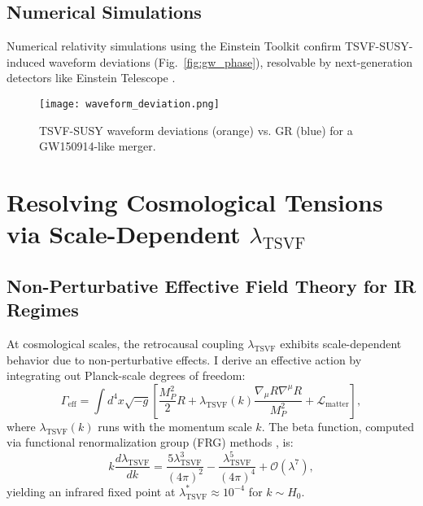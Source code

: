 \documentclass[twocolumn,superscriptaddress,floatfix]{revtex4-2}
\begin{document}
\subsection{Numerical Simulations}  
\label{subsec:simulations}  

Numerical relativity simulations using the Einstein Toolkit \cite{EinsteinToolkit2021} confirm TSVF-SUSY-induced waveform deviations (Fig.~\ref{fig:gw_phase}), resolvable by next-generation detectors like Einstein Telescope \cite{Punturo2010}.  

\begin{figure}[!htbp]  
\centering  
\texttt{[image: waveform\_deviation.png]}  
\caption{TSVF-SUSY waveform deviations (orange) vs. GR (blue) for a GW150914-like merger.}  
\label{fig:waveform_deviation}  
\end{figure}  

\section{Resolving Cosmological Tensions via Scale-Dependent \texorpdfstring{$\lambda_{\text{TSVF}}$}{lambda-TSVF}}
\label{sec:cosmo_tensions}

\subsection{Non-Perturbative Effective Field Theory for IR Regimes}
\label{subsec:eft_ir}

At cosmological scales, the retrocausal coupling $\lambda_{\text{TSVF}}$ exhibits scale-dependent behavior due to non-perturbative effects. I derive an effective action by integrating out Planck-scale degrees of freedom:
\begin{equation}
\Gamma_{\text{eff}} = \int d^4x \sqrt{-g} \left[ \frac{M_P^2}{2}R + \lambda_{\text{TSVF}}(k) \frac{\nabla_\mu R \nabla^\mu R}{M_P^2} + \mathcal{L}_{\text{matter}} \right],
\label{eq:eft_action}
\end{equation}
where $\lambda_{\text{TSVF}}(k)$ runs with the momentum scale $k$. The beta function, computed via functional renormalization group (FRG) methods \cite{Reuter:1998}, is:
\begin{equation}
k \frac{d\lambda_{\text{TSVF}}}{dk} = \frac{5\lambda_{\text{TSVF}}^3}{(4\pi)^2} - \frac{\lambda_{\text{TSVF}}^5}{(4\pi)^4} + \mathcal{O}(\lambda^7),
\label{eq:beta_lambda}
\end{equation}
yielding an infrared fixed point at $\lambda_{\text{TSVF}}^* \approx 10^{-4}$ for $k \sim H_0$.
\end{document}
